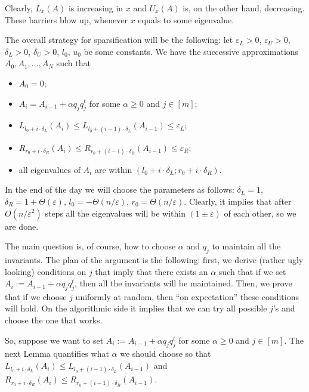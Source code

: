 \documentclass[12pt]{article}
\newcommand{\eps}{\varepsilon}
\begin{document}
    Clearly, $L_x(A)$ is increasing in $x$ and $U_x(A)$ is, on the other hand, decreasing.
    These barriers blow up, whenever $x$ equals to some eigenvalue.

    The overall strategy for sparsification will be the following:
    let $\eps_L > 0$, $\eps_U > 0$, $\delta_L > 0$, $\delta_U > 0$, $l_0$, $u_0$ be some
    constants. We have the successive approximations $A_0, A_1, \ldots, A_N$ such that
    \begin{itemize}
        \item $A_0 = 0$;
        \item $A_i = A_{i-1} + \alpha q_j q_j^t$ for some $\alpha \geq 0$ and $j \in [m]$;
        \item $L_{l_0 + i \cdot \delta_L}(A_i) \leq L_{l_0 +
            (i - 1) \cdot \delta_L}(A_{i-1})
              \leq \eps_L$;
        \item $R_{r_0 + i \cdot \delta_R}(A_i) \leq R_{r_0 +
            (i - 1) \cdot \delta_R}(A_{i-1})
              \leq \eps_R$;
        \item all eigenvalues of $A_i$ are within $(l_0 + i \cdot \delta_L; r_0 + i \cdot
              \delta_R)$.
    \end{itemize}

    In the end of the day we will choose the parameters as follows: $\delta_L = 1$,
    $\delta_R = 1 + \Theta(\eps)$, $l_0 = -\Theta(n / \eps)$, $r_0 = \Theta(n / \eps)$.
    Clearly, it implies that after $O(n / \eps^2)$ steps all the eigenvalues will be
    within $(1 \pm \eps)$ of each other, so we are done.

    The main question is, of course, how to choose $\alpha$ and $q_j$ to maintain all the
    invariants. The plan of the argument is the following: first, we derive
    (rather ugly looking) conditions on $j$ that imply that there exists an $\alpha$ such
    that if we set $A_i := A_{i-1} + \alpha q_j q_j^t$, then all the invariants will be
    maintained. Then, we prove that if we choose $j$ uniformly at random, then
    ``on expectation'' these conditions will hold.
    On the algorithmic side it implies that we can try all possible $j$'s and choose the
    one that works.

    So, suppose we want to set $A_i := A_{i-1} + \alpha q_j q_j^t$ for some $\alpha \geq 0$
    and $j \in [m]$. The next Lemma quantifies what $\alpha$ we should choose so that
    $L_{l_0 + i \cdot \delta_L}(A_i) \leq L_{l_0 + (i - 1) \cdot \delta_L}(A_{i-1})$
    and $R_{r_0 + i \cdot \delta_R}(A_i) \leq R_{r_0 + (i - 1) \cdot \delta_R}(A_{i-1})$.
\end{document}
